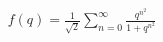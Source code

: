 \documentclass[preview]{standalone}
\begin{document}
\begin{align*}
f(q) = \frac{1}{\sqrt{2}} \sum_{n=0}^{\infty} \frac{q^{n^2}}{1+q^{n^2}}
\end{align*}
\end{document}
